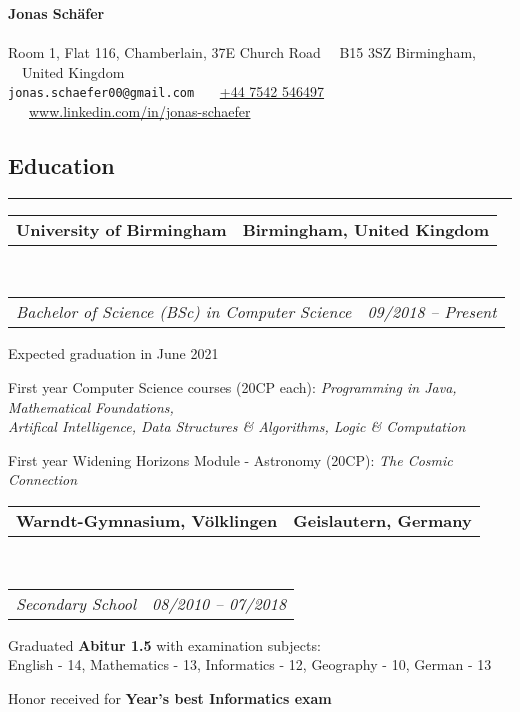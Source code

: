 \documentclass[10pt,letterpaper]{article}
\makeatletter
\newcommand{\headerrow}[2]
{\begin{tabular*}{\linewidth}{l@{\extracolsep{\fill}}r}
	#1 &
	#2 \\
\end{tabular*}}
\makeatother
\begin{document}
\begin{center}
{\LARGE \textbf{Jonas Schäfer}}
\\
\ \\
Room 1, Flat 116, Chamberlain, 37E Church Road \ \ B15 3SZ Birmingham, \ \ United Kingdom
\\
\texttt{jonas.schaefer00@gmail.com} \ \textbullet \ \ \href{tel:+44 7542 546497}{+44 7542 546497}‬ \ \textbullet \ \ \href{https://www.linkedin.com/in/jonas-schaefer/}{www.linkedin.com/in/jonas-schaefer}
\end{center}

\subsection*{Education}
\hrule
\vspace{0.4em}

\noindent
\headerrow{\textbf{University of Birmingham}}{\textbf{Birmingham, United Kingdom}}
\\
\headerrow{\emph{Bachelor of Science (BSc) in Computer Science}}{\emph{09/2018 -- Present}}
\vspace{-1.6em}
\begin{itemize*}
    \item Expected graduation in June 2021
    \item First year Computer Science courses (20CP each): \emph{Programming in Java, Mathematical Foundations, \\Artifical Intelligence, Data Structures \& Algorithms, Logic \& Computation}
    \item First year Widening Horizons Module - Astronomy (20CP): \emph{The Cosmic Connection}


\end{itemize*}

\noindent
\headerrow{\textbf{Warndt-Gymnasium, Völklingen}}{\textbf{Geislautern, Germany}}
\\
\headerrow{\emph{Secondary School}}{\emph{08/2010 -- 07/2018}}
\vspace{-1.6em}
\begin{itemize*}
	\item Graduated \textbf{Abitur 1.5} with examination subjects:\\
       English - 14, Mathematics - 13, Informatics - 12, Geography - 10,
       German - 13
    \item Honor received for \textbf{Year's best Informatics exam}

\end{itemize*}
\end{document}
